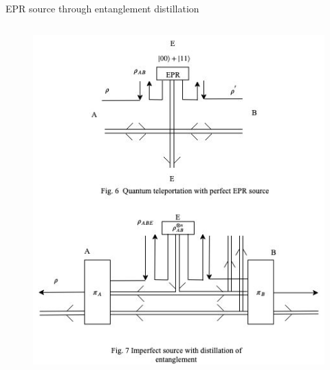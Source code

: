 \documentclass[final]{beamer}
\newlength{\twocolwid}
\begin{document}
\begin{frame}[t]
\begin{columns}[t]
\begin{column}{\twocolwid}
\begin{block}{EPR source through entanglement distillation}
\begin{columns}
    \begin{column}{.40\textwidth}
        \begin{figure}
         \includegraphics[width=0.95\linewidth]{direct_quantum_link_imperfect.jpg}
       \end{figure}
    \end{column}%
\end{columns}

\vskip 2cm 


\end{block}
\end{column}
\end{columns}
\end{frame}
\end{document}
